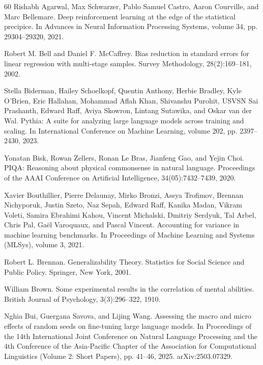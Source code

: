\begin{thebibliography}{60}
Rishabh Agarwal, Max Schwarzer, Pablo Samuel Castro, Aaron Courville, and Marc Bellemare. Deep reinforcement learning at the edge of the statistical precipice. In Advances in Neural Information Processing Systems, volume 34, pp. 29304--29320, 2021.

Robert M. Bell and Daniel F. McCaffrey. Bias reduction in standard errors for linear regression with multi-stage samples. Survey Methodology, 28(2):169--181, 2002.

Stella Biderman, Hailey Schoelkopf, Quentin Anthony, Herbie Bradley, Kyle O'Brien, Eric Hallahan, Mohammad Aflah Khan, Shivanshu Purohit, USVSN Sai Prashanth, Edward Raff, Aviya Skowron, Lintang Sutawika, and Oskar van der Wal. Pythia: A suite for analyzing large language models across training and scaling. In International Conference on Machine Learning, volume 202, pp. 2397--2430, 2023.

Yonatan Bisk, Rowan Zellers, Ronan Le Bras, Jianfeng Gao, and Yejin Choi. PIQA: Reasoning about physical commonsense in natural language. Proceedings of the AAAI Conference on Artificial Intelligence, 34(05):7432--7439, 2020.

Xavier Bouthillier, Pierre Delaunay, Mirko Bronzi, Assya Trofimov, Brennan Nichyporuk, Justin Szeto, Naz Sepah, Edward Raff, Kanika Madan, Vikram Voleti, Samira Ebrahimi Kahou, Vincent Michalski, Dmitriy Serdyuk, Tal Arbel, Chris Pal, Ga\"{e}l Varoquaux, and Pascal Vincent. Accounting for variance in machine learning benchmarks. In Proceedings of Machine Learning and Systems (MLSys), volume 3, 2021.

Robert L. Brennan. Generalizability Theory. Statistics for Social Science and Public Policy. Springer, New York, 2001.

William Brown. Some experimental results in the correlation of mental abilities. British Journal of Psychology, 3(3):296--322, 1910.

Nghia Bui, Guergana Savova, and Lijing Wang. Assessing the macro and micro effects of random seeds on fine-tuning large language models. In Proceedings of the 14th International Joint Conference on Natural Language Processing and the 4th Conference of the Asia-Pacific Chapter of the Association for Computational Linguistics (Volume 2: Short Papers), pp. 41--46, 2025. arXiv:2503.07329.


\end{thebibliography}
